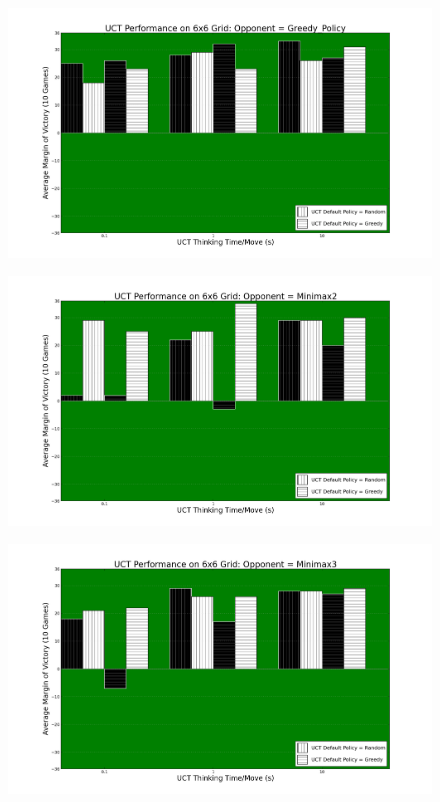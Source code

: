 \documentclass[12pt,letterpaper]{article}
\begin{document}
\begin{figure}[!hp]
\begin{center}
\includegraphics[scale=.4]{66_Greedy_Policy}
\end{center}
\end{figure}

\begin{figure}[!hp]
\begin{center}
\includegraphics[scale=.4]{66_Minimax2}
\end{center}
\end{figure}

\begin{figure}[!hp]
\begin{center}
\includegraphics[scale=.4]{66_Minimax3}
\end{center}
\end{figure}
\end{document}

